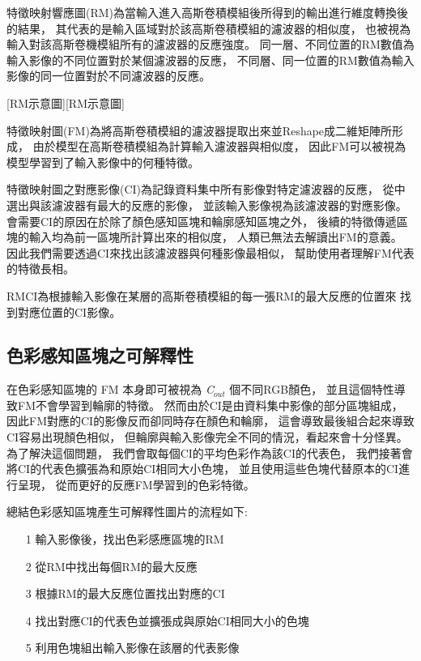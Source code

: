 \documentclass[class=NCU_thesis, crop=false]{standalone}
\begin{document}
	特徵映射響應圖(RM)為當輸入進入高斯卷積模組後所得到的輸出進行維度轉換後的結果，
	其代表的是輸入區域對於該高斯卷積模組的濾波器的相似度，
	也被視為輸入對該高斯卷機模組所有的濾波器的反應強度。
	同一層、不同位置的RM數值為輸入影像的不同位置對於某個濾波器的反應，
	不同層、同一位置的RM數值為輸入影像的同一位置對於不同濾波器的反應。

	[RM示意圖\cite{YangCNNInterpretable}][RM示意圖]

	特徵映射圖(FM)為將高斯卷積模組的濾波器提取出來並Reshape成二維矩陣所形成，
	由於模型在高斯卷積模組為計算輸入濾波器與相似度，
	因此FM可以被視為模型學習到了輸入影像中的何種特徵。

	特徵映射圖之對應影像(CI)為記錄資料集中所有影像對特定濾波器的反應，
	從中選出與該濾波器有最大的反應的影像，
	並該輸入影像視為該濾波器的對應影像。
	會需要CI的原因在於除了顏色感知區塊和輪廓感知區塊之外，
	後續的特徵傳遞區塊的輸入均為前一區塊所計算出來的相似度，
	人類已無法去解讀出FM的意義。
	因此我們需要透過CI來找出該濾波器與何種影像最相似，
	幫助使用者理解FM代表的特徵長相。

	RM\-CI為根據輸入影像在某層的高斯卷積模組的每一張RM的最大反應的位置來
	找到對應位置的CI影像。

	\subsection{色彩感知區塊之可解釋性}
	在色彩感知區塊的 FM 本身即可被視為 \textit{C}$_{out}$ 個不同RGB顏色，
	並且這個特性導致FM不會學習到輪廓的特徵。
	然而由於CI是由資料集中影像的部分區塊組成，
	因此FM對應的CI的影像反而卻同時存在顏色和輪廓，
	這會導致最後組合起來導致CI容易出現顏色相似，
	但輪廓與輸入影像完全不同的情況，看起來會十分怪異。
	為了解決這個問題，
	我們會取每個CI的平均色彩作為該CI的代表色，
	我們接著會將CI的代表色擴張為和原始CI相同大小色塊，
	並且使用這些色塊代替原本的CI進行呈現，
	從而更好的反應FM學習到的色彩特徵。

	總結色彩感知區塊產生可解釋性圖片的流程如下:
	\begin{itemize}
		\item [1]
		輸入影像後，找出色彩感應區塊的RM
		\item [2]
		從RM中找出每個RM的最大反應
		\item [3]
		根據RM的最大反應位置找出對應的CI
		\item [4]
		找出對應CI的代表色並擴張成與原始CI相同大小的色塊
		\item [5]
		利用色塊組出輸入影像在該層的代表影像
	\end{itemize}
\end{document}
